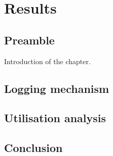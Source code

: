 \chapter{Results}
\label{chap:3}

\section{Preamble}
Introduction of the chapter.

\section{Logging mechanism}

\section{Utilisation analysis}

\section{Conclusion}
